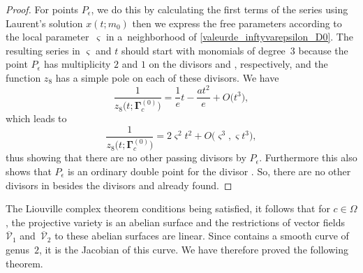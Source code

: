 \documentclass[10pt,a4paper]{amsart}
\numberwithin{equation}{section}
\begin{document}
\begin{proof}
For points $P_{\epsilon}$, we do this by calculating
 the first terms of the series  using Laurent's solution $x(t;m_0)$ then we express the free parameters according to the local parameter~$\varsigma$ in a~neighborhood of \eqref{valeurde_inftyvarepsilon_D0}. The resulting series in $\varsigma$ and $t$ should
 start with monomials of degree~$3$ because the point $P_{\epsilon}$ has multiplicity $2$ and $1$ on the divisors  and , respectively, and the function $z_{8}$ has a simple pole on each of these divisors. We have
 \[
 \frac{1}{z_{8}\bigl(t;\mathbf{\Gamma}_c^{(0)}\bigr)}=\frac{1}{e}t-\frac{at^2}{e} + O\bigl(t^3\bigr),
 \]
 which leads to
 \[
 \frac{1}{z_{8}\bigl(t;\mathbf{\Gamma}_c^{(0)}\bigr)}=2\varsigma^2 t^ 2+O\bigl(\varsigma^3,\varsigma t^3\bigr),
 \] thus showing that there are no other passing divisors
 by $P_{\epsilon}$. Furthermore this also shows that $P_{\epsilon}$
 is an ordinary double point for the divisor . So, there are no other divisors in  besides the divisors  and
  already found.
\end{proof}

 The Liouville complex theorem conditions being
 satisfied, it follows that for $c\in \Omega$, the
 projective variety  is an abelian surface and the restrictions of vector fields~$\overline{\mathcal{V}}_1$
 and~$\overline{\mathcal{V}}_2$ to these abelian surfaces are linear.
 Since  contains a smooth curve of genus~$2$, it is the Jacobian of this curve.
 We have therefore proved the following theorem.
\end{document}
